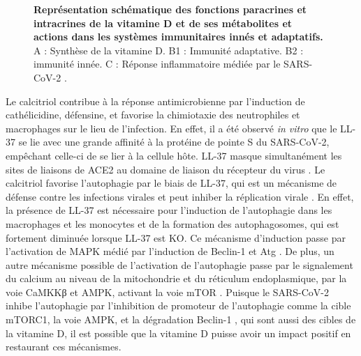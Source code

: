 \documentclass[
  a4paper,
  DIV=11,
  numbers=noendperiod,
  listof=totoc]{scrreprt}
\begin{document}
\begin{figure}


\caption[Représentation schématique des fonctions paracrines et
intracrines de la vitamine D et de ses métabolites et actions dans les
systèmes immunitaires innés et
adaptatifs.]{\label{fig-vd-covid-function}\textbf{Représentation
schématique des fonctions paracrines et intracrines de la vitamine D et
de ses métabolites et actions dans les systèmes immunitaires innés et
adaptatifs.} A : Synthèse de la vitamine D. B1 : Immunité adaptative. B2
: immunité innée. C : Réponse inflammatoire médiée par le SARS-CoV-2
\autocite{Contreras-Bolívar.2023}.}

\end{figure}%

Le calcitriol contribue à la réponse antimicrobienne par l'induction de
cathélicidine, défensine, et favorise la chimiotaxie des neutrophiles et
macrophages sur le lieu de l'infection. En effet, il a été observé
\emph{in vitro} que le LL-37 se lie avec une grande affinité à la
protéine de pointe S du SARS-CoV-2, empêchant celle-ci de se lier à la
cellule hôte. LL-37 masque simultanément les sites de liaisons de
\ac{ACE2} au domaine de liaison du récepteur du virus
\autocite{Wang.2021.ACS}. Le calcitriol favorise l'autophagie par le
biais de LL-37, qui est un mécanisme de défense contre les infections
virales et peut inhiber la réplication virale \autocite{Gotelli.2022}.
En effet, la présence de LL-37 est nécessaire pour l'induction de
l'autophagie dans les macrophages et les monocytes et de la formation
des autophagosomes, qui est fortement diminuée lorsque LL-37 est KO. Ce
mécanisme d'induction passe par l'activation de \ac{MAPK} médié par
l'induction de Beclin-1 et Atg \autocite{Yuk.2009}. De plus, un autre
mécanisme possible de l'activation de l'autophagie passe par le
signalement du calcium au niveau de la mitochondrie et du réticulum
endoplasmique, par la voie \ac{CaMKKβ} et \ac{AMPK}, activant la voie
mTOR \autocite{Yuk.2009,Shiravi.2022}. Puisque le SARS-CoV-2 inhibe
l'autophagie par l'inhibition de promoteur de l'autophagie comme la
cible \ac{mTORC1}, la voie \ac{AMPK}, et la dégradation Beclin-1
\autocite{Gotelli.2022}, qui sont aussi des cibles de la vitamine D, il
est possible que la vitamine D puisse avoir un impact positif en
restaurant ces mécanismes.
\end{document}
